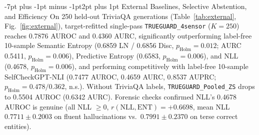 \documentclass[10pt,twocolumn,letterpaper]{article}
\makeatletter
\renewcommand{\subsection}{\@startsection{subsection}{2}{\z@}%
  {-7pt plus -1pt minus -1pt}{2pt plus 1pt}%
  {\normalfont\normalsize\itshape\color{black}}}
\makeatother
\begin{document}
\subsection{External Baselines, Selective Abstention, and Efficiency}
On 250 held-out TriviaQA generations (Table~\ref{tab:external}, Fig.~\ref{fig:external}), target-refitted single-pass \texttt{TRUEGUARD\_4sensor} ($K = 250$) reaches 0.7876 AUROC and 0.4360 AURC, significantly outperforming label-free 10-sample Semantic Entropy (0.6859 LN / 0.6856 Disc, $p_{\text{Holm}} = 0.012$; AURC 0.5411, $p_{\text{Holm}} = 0.006$), Predictive Entropy (0.6583, $p_{\text{Holm}} = 0.006$), and NLL (0.4678, $p_{\text{Holm}} = 0.006$), and performing competitively with label-free 10-sample SelfCheckGPT-NLI (0.7477 AUROC, 0.4659 AURC, 0.8537 AUPRC; $p_{\text{Holm}} = 0.478 / 0.362$, n.s.). Without TriviaQA labels, \texttt{TRUEGUARD\_Pooled\_ZS} drops to 0.5504 AUROC (0.6342 AURC). Forensic checks confirmed NLL's 0.4678 AUROC is genuine (all NLL $\ge 0$, $r(\text{NLL}, \text{ENT}) = +0.6698$, mean NLL $0.7711 \pm 0.2003$ on fluent hallucinations vs.\ $0.7991 \pm 0.2370$ on terse correct entities).
\end{document}
